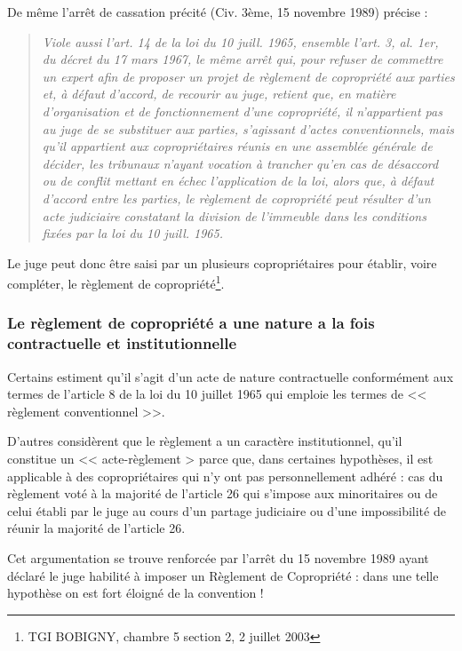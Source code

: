 			De même l’arrêt de cassation précité (Civ. 3ème, 15 novembre 1989) précise :
			\begin{quote}
					\itshape
					Viole aussi l'art. 14 de la loi du 10 juill. 1965, ensemble l'art. 3, al. 1er, du décret du 17 mars 1967, le même arrêt qui, pour refuser de commettre un expert afin de proposer un projet de règlement de copropriété aux parties et, à défaut d'accord, de recourir au juge, retient que, en matière d'organisation et de fonctionnement d'une copropriété, il n'appartient pas au juge de se substituer aux parties, s'agissant d'actes conventionnels, mais qu'il appartient aux copropriétaires réunis en une assemblée générale de décider, les tribunaux n'ayant vocation à trancher qu'en cas de désaccord ou de conflit mettant en échec l'application de la loi, alors que, à défaut d'accord entre les parties, le règlement de copropriété peut résulter d'un acte judiciaire constatant la division de l'immeuble dans les conditions fixées par la loi du 10 juill. 1965.
			\end{quote}
	
			Le juge peut donc être saisi par un plusieurs copropriétaires pour établir, voire compléter, le règlement de copropriété\footnote{TGI BOBIGNY, chambre 5 section 2, 2 juillet 2003}.
		
		\subsubsection{Le règlement de copropriété a une nature a la fois contractuelle et institutionnelle}
		
			Certains estiment qu'il s'agit d'un acte de nature contractuelle conformément aux termes de l'article 8 de la loi du 10 juillet 1965 qui emploie les termes de << règlement conventionnel >>.
			
			D'autres considèrent que le règlement a un caractère institutionnel, qu'il constitue un << acte-règlement >  parce que, dans certaines hypothèses, il est applicable à des copropriétaires qui n'y ont pas personnellement adhéré : cas du règlement voté à la majorité de l'article 26 qui s'impose aux minoritaires ou de celui établi par le juge au cours d'un partage judiciaire ou d'une impossibilité de réunir la majorité de l'article 26.
			
			Cet argumentation se trouve renforcée par l'arrêt du 15 novembre 1989 ayant déclaré le juge habilité à imposer un Règlement de Copropriété : dans une telle hypothèse on est fort éloigné de la convention !
			
